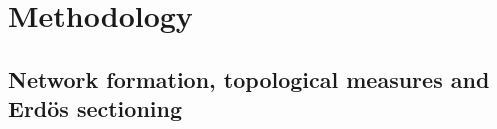 \documentclass[%
 aip,
 jmp,%
 amsmath,amssymb,
 reprint,%
]{revtex4-1}
\begin{document}
%		


\section{Methodology}\label{sec:methods}


\subsection{Network formation, topological measures and Erd\"os sectioning}\label{subsec:net}
\end{document}
